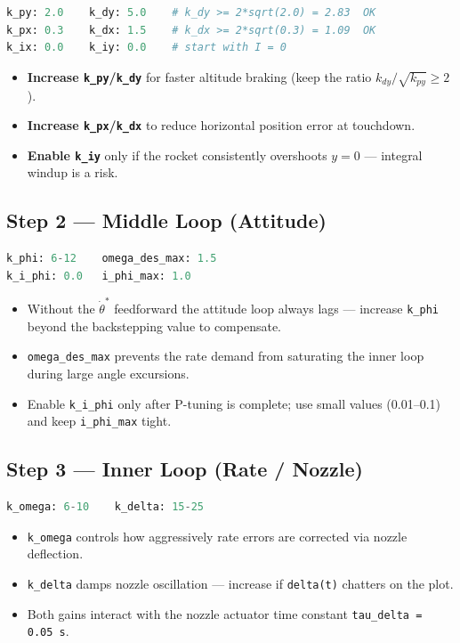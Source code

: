 \documentclass[11pt,a4paper]{article}
\begin{document}
\begin{lstlisting}[language=Python]
k_py: 2.0    k_dy: 5.0    # k_dy >= 2*sqrt(2.0) = 2.83  OK
k_px: 0.3    k_dx: 1.5    # k_dx >= 2*sqrt(0.3) = 1.09  OK
k_ix: 0.0    k_iy: 0.0    # start with I = 0
\end{lstlisting}

\begin{itemize}
  \item \textbf{Increase \texttt{k\_py}/\texttt{k\_dy}} for faster altitude braking (keep the ratio $k_{dy}/\sqrt{k_{py}} \geq 2$).
  \item \textbf{Increase \texttt{k\_px}/\texttt{k\_dx}} to reduce horizontal position error at touchdown.
  \item \textbf{Enable \texttt{k\_iy}} only if the rocket consistently overshoots $y=0$ --- integral windup is a risk.
\end{itemize}

\subsection{Step 2 --- Middle Loop (Attitude)}

\begin{lstlisting}[language=Python]
k_phi: 6-12    omega_des_max: 1.5
k_i_phi: 0.0   i_phi_max: 1.0
\end{lstlisting}

\begin{itemize}
  \item Without the $\dot\theta^*$ feedforward the attitude loop always lags --- increase \texttt{k\_phi} beyond the backstepping value to compensate.
  \item \texttt{omega\_des\_max} prevents the rate demand from saturating the inner loop during large angle excursions.
  \item Enable \texttt{k\_i\_phi} only after P-tuning is complete; use small values (0.01--0.1) and keep \texttt{i\_phi\_max} tight.
\end{itemize}

\subsection{Step 3 --- Inner Loop (Rate / Nozzle)}

\begin{lstlisting}[language=Python]
k_omega: 6-10    k_delta: 15-25
\end{lstlisting}

\begin{itemize}
  \item \texttt{k\_omega} controls how aggressively rate errors are corrected via nozzle deflection.
  \item \texttt{k\_delta} damps nozzle oscillation --- increase if \texttt{delta(t)} chatters on the plot.
  \item Both gains interact with the nozzle actuator time constant \texttt{tau\_delta = 0.05\,s}.
\end{itemize}
\end{document}
